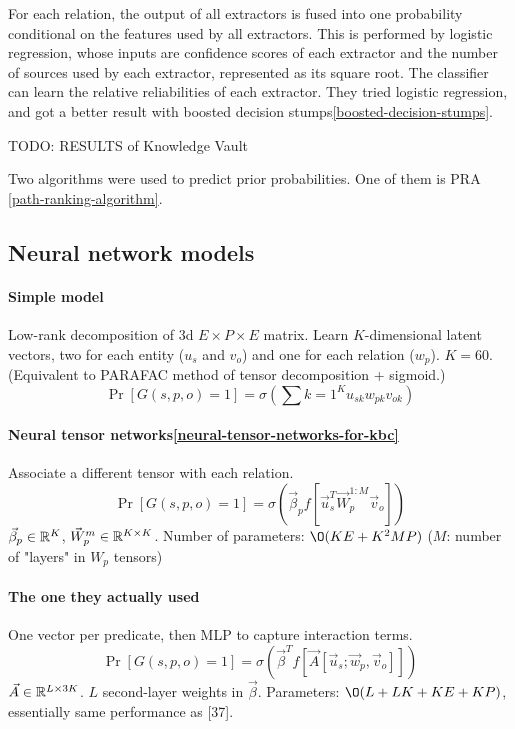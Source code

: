 For each relation, the output of all extractors is fused into one probability
conditional on the features used by all extractors. This is performed by
logistic regression, whose inputs are confidence scores of each extractor and
the number of sources used by each extractor, represented as its square root.
The classifier can learn the relative reliabilities of each extractor.
They tried logistic regression, and got a better result with boosted decision
stumps\ref{boosted-decision-stumps}.

TODO: RESULTS of Knowledge Vault

Two algorithms were used to predict prior probabilities.
One of them is PRA \ref{path-ranking-algorithm}.

\subsection{Neural network models}

\paragraph{Simple model}
Low-rank decomposition of 3d $E\times P\times E$ matrix. Learn $K$-dimensional
latent vectors, two for each entity ($u_s$ and $v_o$) and one for each relation
($w_p$). $K=60$. (Equivalent to PARAFAC method of tensor decomposition +
sigmoid.)
$$\Pr[G(s,p,o)=1] = \sigma(\sum\limits{k=1}^K u_{sk} w_{pk} v_{ok})$$

\paragraph{Neural tensor networks\ref{neural-tensor-networks-for-kbc}}
Associate a different tensor with each relation.
$$\Pr[G(s,p,o)=1] = \sigma(\vec{\beta}_p f[\vec{u}_s^T \vec{W}_p^{1:M} \vec{v}_o])$$
$\vec{\beta}_p\in\mathbb{R}^K$, $\vec{W}_p^m\in\mathbb{R}^{K\times K}$.
Number of parameters: $\O(KE+K^2 MP)$ ($M$: number of "layers" in $W_p$ tensors)

\paragraph{The one they actually used}
One vector per predicate, then MLP to capture interaction terms.
$$\Pr[G(s,p,o)=1]=\sigma(\vec{\beta}^T f[\vec{A} [\vec{u}_s; \vec{w}_p, \vec{v}_o] ])$$
$\vec{A}\in\mathbb{R}^{L\times 3K}$.
$L$ second-layer weights in $\vec{\beta}$.
Parameters: $\O(L+LK+KE+KP)$, essentially same performance as [37].

